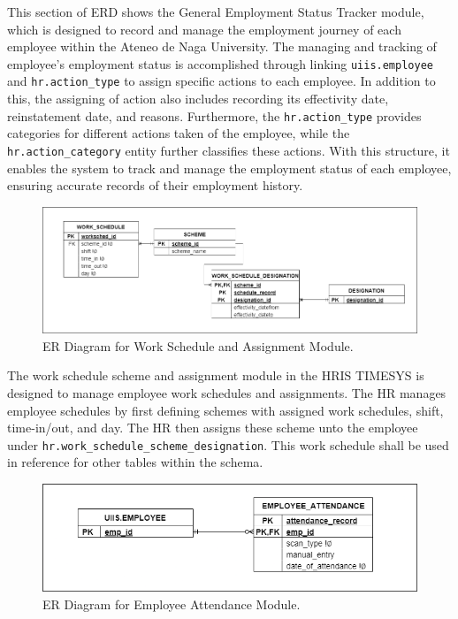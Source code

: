     This section of ERD shows the General Employment Status Tracker module, which is designed to record and manage the employment journey of each employee within the Ateneo de Naga University. The managing and tracking of employee's employment status is accomplished through linking \texttt{uiis.employee} and \texttt{hr.action\_type} to assign specific actions to each employee. In addition to this, the assigning of action also includes recording its effectivity date, reinstatement date, and reasons. Furthermore, the \texttt{hr.action\_type} provides categories for different actions taken of the employee, while the \texttt{hr.action\_category} entity further classifies these actions. With this structure, it enables the system to track and manage the employment status of each employee, ensuring accurate records of their employment history.

    \begin{figure}[H]
        \centering
        \includegraphics[width=1\linewidth]{figures/images/diagrams/erd/erd-timesys-work-schedule-scheme-and-assignment.png}
        \caption{ER Diagram for Work Schedule and Assignment Module.}
        \label{fig:erd-timesys-work-schedule-scheme-and-assignment}
    \end{figure}

    The work schedule scheme and assignment module in the HRIS TIMESYS is designed to manage employee work schedules and assignments. The HR manages employee schedules by first defining schemes with assigned work schedules, shift, time-in/out, and day. The HR then assigns these scheme unto the employee under \texttt{hr.work\_schedule\_scheme\_designation}. This work schedule shall be used in reference for other tables within the schema.

    \begin{figure}[H]
        \centering
        \includegraphics[width=1\linewidth]{figures/images/diagrams/erd/erd-timesys-employee-attendance.png}
        \caption{ER Diagram for  Employee Attendance Module.}
        \label{fig:erd-timesys-employee-attendance}
    \end{figure}

